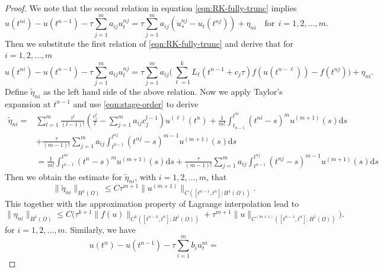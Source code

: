 \documentclass[a4paper, oneside]{book}
\def\d{{\mathrm{d}}}
\def\l{\left}
\def\r{\right}
\def\d{\mathrm{d}}
\def\II{(\Omega)}
\begin{document}
\begin{proof}
We note that the second relation in equation \eqref{eqn:RK-fully-trunc} implies
\begin{equation*}
 u(t^{ni}) -   u(t^{n-1}) -\tau\sum_{j=1}^m a_{ij}  u_t^{nj} =
 \tau \sum_{j=1}^m a_{ij} (\dot u_*^{nj} - u_t(t^{nj}))+
 \eta_{ni}\quad \text{for} ~~i=1,2,\dots,m.
\end{equation*}
Then we substitute the first relation of \eqref{eqn:RK-fully-trunc} and derive that
for $i=1,2,\dots,m$
\begin{equation*}
 u(t^{ni}) -   u(t^{n-1}) -\tau\sum_{j=1}^m a_{ij}  u_t^{nj} =
 \tau \sum_{j=1}^m a_{ij}   \Big(\sum_{\ell=1}^k L_{\ell}(t^{n-1}+c_j\tau) f(u(t^{n-\ell})) - f(t^{nj})\Big)+
 \eta_{ni}.
\end{equation*}
Define $\tilde\eta_{ni}$ as the left hand side of the above relation. %
Now we apply Taylor's expansion at $t^{n-1}$  and use \eqref{eqn:stage-order} to derive
\begin{equation*}
\begin{aligned}
\tilde\eta_{ni} =& \sum_{l=1}^{m}\frac{\tau^l}{(l-1)!}\l(\frac{c_i^l}l -
\sum_{j=1}^ma_{ij}c_j^{l-1}\r)u^{(\ell)}(t^n) +
\frac1{m!}\int_{t_{n-1}}^{t^{ni}} (t^{ni}-s)^{m} u^{(m+1)}(s) \d s \\
&+ \frac\tau{(m-1)!}\sum_{j=1}^ma_{ij}\int_{t^{n-1}}^{t^{nj}}
(t^{nj}-s)^{m-1} u^{(m+1)}(s) \d s\\
&=\frac1{m!}\int_{t^{n-1}}^{t^{ni}} (t^n-s)^{m} u^{(m+1)}(s) \d s
+ \frac\tau{(m-1)!}\sum_{j=1}^ma_{ij}\int_{t^{n-1}}^{t^{nj}}
(t^{nj}-s)^{m-1} u^{(m+1)}(s) \d s
\end{aligned}
\end{equation*}
Then we obtain the estimate for $\tilde\eta_{ni}$, with $i=1,2,\dots,m$, that
\begin{equation*}
\|\tilde\eta_{ni}\|_{H^1(\Omega)} \leq C\tau^{m+1} \|u^{(m+1)}\|_{C([t^{n-1},t^n];H^1(\Omega))}.
\end{equation*}
This together with the approximation property of Lagrange interpolation lead to
\begin{equation*}
    \|\eta_{ni}\|_{H^1(\Omega)} \leq C\Big(\tau^{k+1} \| f(u)  \|_{C^{k}([t^{n-k},t^n]; H^1\II)}
    + \tau^{m+1} \|u\|_{C^{(m+1)}([t^{n-1},t^n];H^1(\Omega))} \Big). %
\end{equation*}
for $i=1,2,\dots,m$. Similarly, we have
\begin{equation*}
    u(t^{n}) -  u(t^{n-1}) -\tau\sum_{i=1}^m b_i  u_t^{ni} =

\end{equation*}
\end{proof}
\end{document}
